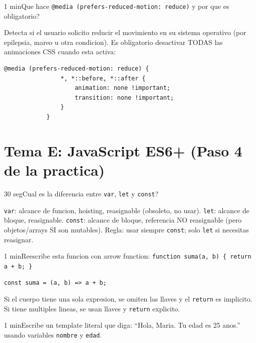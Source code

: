 \documentclass[11pt,a4paper]{article}
\newcounter{nej}
\newcommand{\ej}[2]{%
	\stepcounter{nej}%
	\begin{ejercicio}{\arabic{nej}}{#1}#2\end{ejercicio}\vspace{4pt}}
\begin{document}
	\ej{1 min}{Que hace \texttt{@media (prefers-reduced-motion: reduce)} y por que es obligatorio?}
	
	\begin{respuesta}
		Detecta si el usuario solicito reducir el movimiento en su sistema operativo (por epilepsia, mareo u otra condicion). Es obligatorio desactivar TODAS las animaciones CSS cuando esta activa:
		\begin{lstlisting}[style=codecss]
			@media (prefers-reduced-motion: reduce) {
				*, *::before, *::after {
					animation: none !important;
					transition: none !important;
				}
			}
		\end{lstlisting}
	\end{respuesta}
	\vspace{6pt}
	
	\section{Tema E: JavaScript ES6+ (Paso 4 de la practica)}
	
	\ej{30 seg}{Cual es la diferencia entre \texttt{var}, \texttt{let} y \texttt{const}?}
	
	\begin{respuesta}
		\texttt{var}: alcance de funcion, hoisting, reasignable (obsoleto, no usar). \texttt{let}: alcance de bloque, reasignable. \texttt{const}: alcance de bloque, referencia NO reasignable (pero objetos/arrays SI son mutables). Regla: usar siempre \texttt{const}; solo \texttt{let} si necesitas reasignar.
	\end{respuesta}
	\vspace{6pt}
	
	\ej{1 min}{Reescribe esta funcion con arrow function:
		\texttt{function suma(a, b) \{ return a + b; \}}}
	
	\begin{respuesta}
		\texttt{const suma = (a, b) => a + b;}
		
		Si el cuerpo tiene una sola expresion, se omiten las llaves y el \texttt{return} es implicito. Si tiene multiples lineas, se usan llaves y \texttt{return} explicito.
	\end{respuesta}
	\vspace{6pt}
	
	\ej{1 min}{Escribe un template literal que diga: ``Hola, Maria. Tu edad es 25 anos.'' usando variables \texttt{nombre} y \texttt{edad}.}
	
\end{document}
